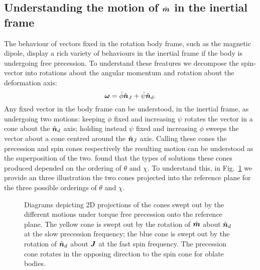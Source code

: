 \documentclass[../full_thesis/full_thesis.tex]{subfiles}
\begin{document}
\subsection{Understanding the motion of $\hat{\boldsymbol{m}}$ in the inertial frame}
\label{sec: understanding the motion of m}
The behaviour of vectors fixed in the rotation body frame, such as the magnetic
dipole, display a rich variety of behaviours in the inertial frame if the body
is undergoing free precession. To understand these freatures we decompose the
spin-vector into rotations about the angular momentum and rotation about the
deformation axis:
\begin{equation}
  \boldsymbol{\omega} = \dot{\phi}\hat{\boldsymbol{n}}_{J} + \dot{\psi}\hat{\boldsymbol{n}}_{d}.
\label{eqn: decomp}
\end{equation}
Any fixed vector in the body frame can be understood, in the inertial frame, as
undergoing two motions: keeping $\phi$ fixed and increasing $\psi$ rotates the
vector in a cone about the $\hat{\boldsymbol{n}}_{d}$ axis; holding instead $\psi$ fixed and
increasing $\phi$ sweeps the vector about a cone centred around the $\hat{\boldsymbol{n}}_{J}$
axis. Calling these cones the precession and spin cones respectively the
resulting motion can be understood as the superposition of the two.
\citet{Jones2001} found that the types of solutions these cones produced
depended on the ordering of $\theta$ and $\chi$. To understand this, in
Fig.~\ref{fig: cones} we provide an three illustration the two cones projected
into the reference plane for the three possible orderings of $\theta$ and $\chi$.
\begin{figure}[ht]
\centering
\caption{Diagrams depicting 2D projections of the cones swept out by the
    different motions under torque free precession onto the reference plane.
    The yellow cone is swept out by the rotation of $\hat{\boldsymbol{m}}$ about $\hat{\boldsymbol{n}}_{d}$ at the
    slow precession frequency; the blue cone is swept out by the rotation of
    $\hat{\boldsymbol{n}}_{d}$ about $\boldsymbol{J}$ at the fast spin frequency. The
precession cone rotates in the opposing direction to the spin cone for oblate
bodies.}
\label{fig: cones}
\end{figure}
\end{document}
